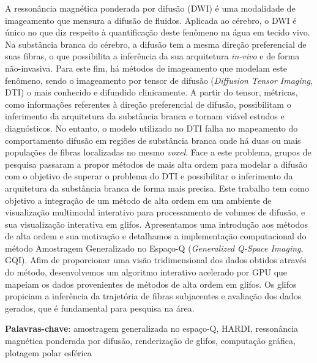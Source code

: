 \documentclass[
    12pt,                %
    oneside,            %
    a4paper,            %
    english,            %
    french,                %
    spanish,            %
    brazil                %
    ]{abntex2}
\begin{document}
\setlength{\absparsep}{18pt} %
\begin{resumo}

A ressonância magnética ponderada por difusão (DWI) é uma modalidade de imageamento que mensura a difusão de fluidos. Aplicada ao cérebro, o DWI é único no que diz respeito à quantificação deste fenômeno na água em tecido vivo. Na substância branca do cérebro, a difusão tem a mesma direção preferencial de suas fibras, o que possibilita a inferência da sua arquitetura \textit{in-vivo} e de forma não-invasiva. Para este fim, há métodos de imageamento que modelam este fenômeno, sendo o imageamento por tensor de difusão (\textit{Diffusion Tensor Imaging}, DTI) o mais conhecido e difundido clinicamente. A partir do tensor, métricas, como informações referentes à direção preferencial de difusão, possibilitam o inferimento da arquitetura da substância branca e tornam viável estudos e diagnósticos. No entanto, o modelo utilizado no DTI falha no mapeamento do comportamento difusão em regiões de substância branca onde há duas ou mais populações de fibras localizadas no mesmo \textit{voxel}. Face a este problema, grupos de pesquisa passaram a propor métodos de mais alta ordem para modelar a difusão com o objetivo de superar o problema do DTI e possibilitar o inferimento da arquitetura da substância branca de forma mais precisa. Este trabalho tem como objetivo a integração de um método de alta ordem em um ambiente de visualização multimodal interativo para processamento de volumes de difusão, e sua visualização interativa em glifos. Apresentamos uma introdução aos métodos de alta ordem e sua motivação e detalhamos a implementação computacional do método Amostragem Generalizado no Espaço-Q (\textit{Generalized Q-Space Imaging}, GQI). Afim de proporcionar uma visão tridimensional dos dados obtidos através do método, desenvolvemos um algoritmo interativo acelerado por GPU que mapeiam os dados provenientes de métodos de alta ordem em glifos. Os glifos propiciam a inferência da trajetória de fibras subjacentes e avaliação dos dados gerados, que é fundamental para pesquisa na área.


\vspace{\onelineskip}
\noindent\textbf{Palavras-chave}: amostragem generalizada no espaço-Q, HARDI, ressonância magnética ponderada por difusão, renderização de glifos, computação gráfica, plotagem polar esférica
\end{resumo}
\pagebreak
%
\end{document}
